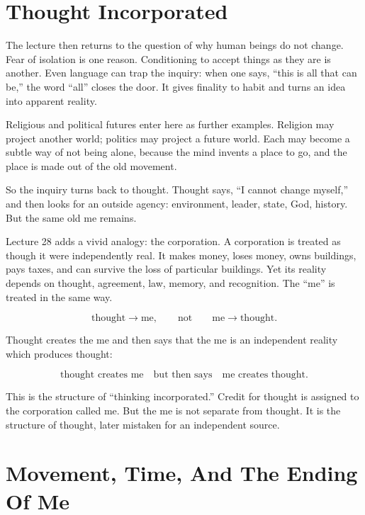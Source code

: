 \documentclass[11pt,oneside]{book}
\begin{document}
\section{Thought Incorporated}

The lecture then returns to the question of why human beings do not change. Fear of isolation is one reason. Conditioning to accept things as they are is another. Even language can trap the inquiry: when one says, ``this is all that can be,'' the word ``all'' closes the door. It gives finality to habit and turns an idea into apparent reality.

Religious and political futures enter here as further examples. Religion may project another world; politics may project a future world. Each may become a subtle way of not being alone, because the mind invents a place to go, and the place is made out of the old movement.

So the inquiry turns back to thought. Thought says, ``I cannot change myself,'' and then looks for an outside agency: environment, leader, state, God, history. But the same old me remains.

Lecture 28 adds a vivid analogy: the corporation. A corporation is treated as though it were independently real. It makes money, loses money, owns buildings, pays taxes, and can survive the loss of particular buildings. Yet its reality depends on thought, agreement, law, memory, and recognition. The ``me'' is treated in the same way.

\begin{equation}
\text{thought} \longrightarrow \text{me},
\qquad
\text{not}
\qquad
\text{me} \longrightarrow \text{thought}.
\end{equation}

Thought creates the me and then says that the me is an independent reality which produces thought:

\begin{equation}
\text{thought creates me}
\quad \text{but then says} \quad
\text{me creates thought}.
\end{equation}

This is the structure of ``thinking incorporated.'' Credit for thought is assigned to the corporation called me. But the me is not separate from thought. It is the structure of thought, later mistaken for an independent source.

\section{Movement, Time, And The Ending Of Me}
\end{document}
